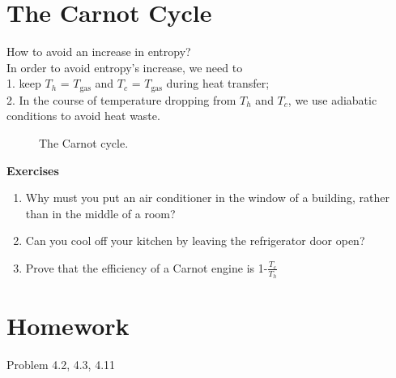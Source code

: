 \section{The Carnot Cycle}
How to avoid an increase in entropy?\\
In order to avoid entropy's increase, we need to \\
1. keep $T_h$ = $T_\text{gas}$ and $T_c$ = $T_\text{gas}$ during heat transfer;\\
2. In the course of temperature dropping from $T_h$ and $T_c$, we use adiabatic conditions to avoid heat waste.
\begin{figure}[ht]
\centering
{}
\caption{The Carnot cycle.}
\end{figure}

{\bf Exercises}\\
\begin{enumerate}
\item Why must you put an air conditioner in the window of a building, rather than in the middle of a room?
\item Can you cool off your kitchen by leaving the refrigerator door open?
\item Prove that the efficiency of a Carnot engine is 1-$\frac{T_c}{T_h}$
\end{enumerate}

\section{Homework}
Problem 4.2, 4.3, 4.11


